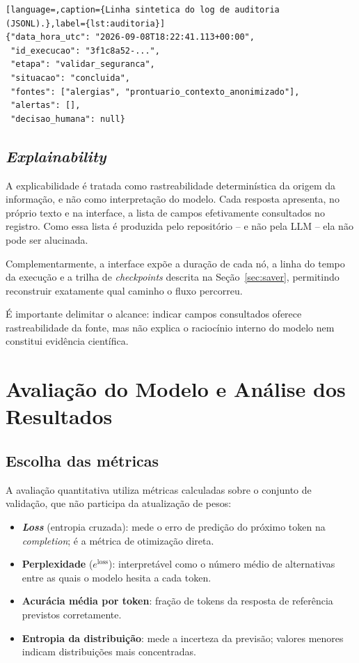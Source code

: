 \documentclass[12pt,a4paper]{article}
\begin{document}
\begin{lstlisting}[language=,caption={Linha sintetica do log de auditoria (JSONL).},label={lst:auditoria}]
{"data_hora_utc": "2026-09-08T18:22:41.113+00:00",
 "id_execucao": "3f1c8a52-...",
 "etapa": "validar_seguranca",
 "situacao": "concluida",
 "fontes": ["alergias", "prontuario_contexto_anonimizado"],
 "alertas": [],
 "decisao_humana": null}
\end{lstlisting}

\subsection{\emph{Explainability}}
\label{sec:explain}

A explicabilidade é tratada como rastreabilidade determinística da origem da
informação, e não como interpretação do modelo. Cada resposta apresenta, no
próprio texto e na interface, a lista de campos efetivamente consultados no
registro. Como essa lista é produzida pelo repositório -- e não pela LLM -- ela
não pode ser alucinada.

Complementarmente, a interface expõe a duração de cada nó, a linha do tempo da
execução e a trilha de \emph{checkpoints} descrita na Seção~\ref{sec:saver},
permitindo reconstruir exatamente qual caminho o fluxo percorreu.

É importante delimitar o alcance: indicar campos consultados oferece
rastreabilidade da fonte, mas não explica o raciocínio interno do modelo nem
constitui evidência científica.

\section{Avaliação do Modelo e Análise dos Resultados}
\label{sec:avaliacao}

\subsection{Escolha das métricas}

A avaliação quantitativa utiliza métricas calculadas sobre o conjunto de
validação, que não participa da atualização de pesos:

\begin{itemize}[leftmargin=*]
  \item \textbf{\emph{Loss}} (entropia cruzada): mede o erro de predição do
        próximo token na \emph{completion}; é a métrica de otimização direta.
  \item \textbf{Perplexidade} ($e^{\text{loss}}$): interpretável como o número
        médio de alternativas entre as quais o modelo hesita a cada token.
  \item \textbf{Acurácia média por token}: fração de tokens da resposta de
        referência previstos corretamente.
  \item \textbf{Entropia da distribuição}: mede a incerteza da previsão; valores
        menores indicam distribuições mais concentradas.
\end{itemize}
\end{document}
